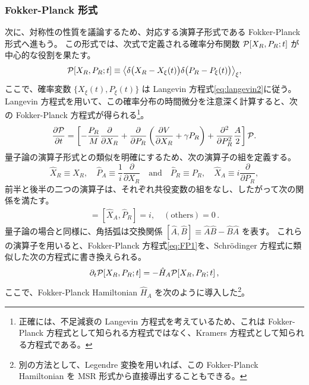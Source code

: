 \subsubsection{Fokker-Planck 形式}
次に、対称性の性質を議論するため、対応する演算子形式である Fokker-Planck 形式へ進もう。
この形式では、次式で定義される確率分布関数 ${\mathcal{P}}[X_R,P_R;t]$ が中心的な役割を果たす。
\begin{equation}
 {\mathcal{P}}[X_R,P_R;t] 
  \equiv 
  \big\langle \delta \big(X_R - X_\xi (t) \big) 
  \delta \big( P_R - P_\xi(t)  \big) \big\rangle_\xi,
\end{equation}
ここで、確率変数 $\{X_\xi (t),P_\xi (t)\}$ は Langevin 方程式\eqref{eq:langevin2}に従う。
Langevin 方程式を用いて、この確率分布の時間微分を注意深く計算すると、次の Fokker-Planck 方程式が得られる\footnote{
正確には、不足減衰の Langevin 方程式を考えているため、これは Fokker-Planck 方程式として知られる方程式ではなく、Kramers 方程式として知られる方程式である。}。
\begin{equation}
 \begin{split}
  \frac{\partial {\mathcal{P}}}{\partial t} 
  = \left[ -\frac{P_R}{M} \frac{\partial}{\partial X_R} 
  + \frac{\partial}{\partial P_R} 
  \left( \frac{\partial V}{\partial X_R}  + \gamma P_R \right)
  + \frac{\partial^2}{\partial P^2_R} \frac{A}{2} \right] 
  {\mathcal{P}} .
 \end{split}
 \label{eq:FP1}
\end{equation}
量子論の演算子形式との類似を明確にするため、次の演算子の組を定義する。
\begin{equation}
 \hat{X}_R \equiv X_R, \quad 
  \hat{P}_A \equiv \frac{1}{i}\dfrac{\partial}{\partial X_R}
  \quad \mathrm{and} \quad
  \hat{P}_R \equiv P_R , \quad 
  \hat{X}_A  \equiv i \dfrac{\partial}{\partial P_R} ,
\end{equation}
前半と後半の二つの演算子は、それぞれ共役変数の組をなし、したがって次の関係を満たす。
\begin{align}
 [\hat{X}_R, \hat{P}_A] = [\hat{X}_A, \hat{P}_R] = i,  
 \quad 
(\mathrm{others}) = 0  \, .
\end{align}
量子論の場合と同様に、角括弧は交換関係 $[\hat{A}, \hat{B}] \equiv \hat{A} \hat{B} - \hat{B} \hat{A}$ を表す。
これらの演算子を用いると、Fokker-Planck 方程式\eqref{eq:FP1}を、Schr\"odinger 方程式に類似した次の方程式に書き換えられる。
\begin{equation}
 \partial_t {\mathcal{P}} [X_R,P_R;t] = - \hat{H}_A {\mathcal{P}} [X_R,P_R;t]\,,\label{eq:sch}
\end{equation}
ここで、Fokker-Planck Hamiltonian $\hat{H}_A$ を次のように導入した\footnote{
別の方法として、Legendre 変換を用いれば、この Fokker-Planck Hamiltonian を MSR 形式から直接導出することもできる。}。
